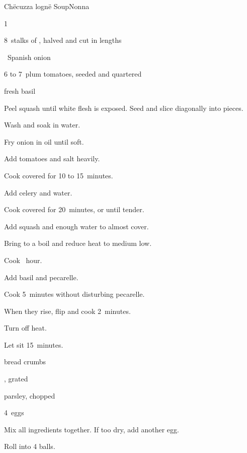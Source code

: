 \begin{recipe}{Ch\"ecuzza logn\"e Soup}{Nonna}{}

\begin{ingredients}
\item 1~
\item 8~stalks of , halved and cut in  lengths
\item \half~Spanish onion
\item 6 to 7~plum tomatoes, seeded and quartered
\item fresh basil
\end{ingredients}

\begin{directions}
\item Peel squash until white flesh is exposed. Seed and slice diagonally into \inch{\threequarter} pieces.
\item Wash and soak in water.
\item Fry onion in oil until soft.
\item Add tomatoes and salt heavily.
\item Cook covered for 10 to 15~minutes.
\item Add celery and  water.
\item Cook covered for 20~minutes, or until tender.
\item Add squash and enough water to almost cover.
\item Bring to a boil and reduce heat to medium low.
\item Cook \half~hour.
\item Add basil and pecarelle.
\item Cook 5~minutes without disturbing pecarelle.
\item When they rise, flip and cook 2~minutes.
\item Turn off heat.
\item Let sit 15~minutes.
\end{directions}

\begin{ingredients}
\item \C{\threequarter} bread crumbs
\item {} , grated
\item parsley, chopped
\item 4~eggs
\end{ingredients}

\begin{directions}
\item Mix all ingredients together. If too dry, add another egg.
\item Roll into 4 balls.
\end{directions}

\end{recipe}
